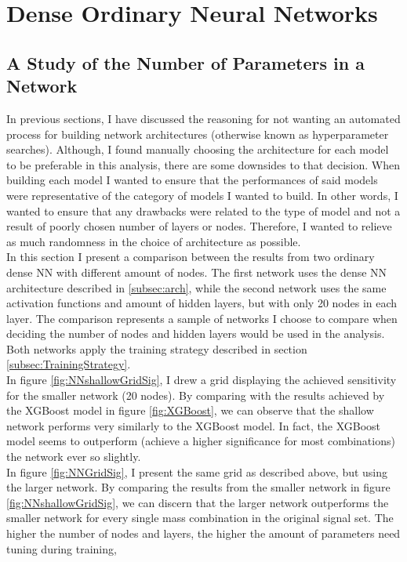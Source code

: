 \section{Dense Ordinary Neural Networks}
\subsection{A Study of the Number of Parameters in a Network}
In previous sections, I have discussed the reasoning for not wanting an automated process for building network architectures (otherwise known
as hyperparameter searches). Although, I found manually choosing the architecture for each model to be preferable in this analysis, there 
are some downsides to that decision. When building each model I wanted to ensure that the performances of said models were representative of 
the category of models I wanted to build. In other words, I wanted to ensure that any drawbacks were related to the type of model and not 
a result of poorly chosen number of layers or nodes. Therefore, I wanted to relieve as much randomness in the choice of architecture as possible.
\\
In this section I present a comparison between the results from two ordinary dense \ac{NN} with different amount of nodes. The first network 
uses the dense \ac{NN} architecture described in \ref{subsec:arch}, while the second network uses the same activation functions and amount of hidden layers,
but with only 20 nodes in each layer. The comparison represents a sample of networks I choose to compare when deciding the number of nodes and 
hidden layers would be used in the analysis. Both networks apply the training strategy described in section \ref{subsec:TrainingStrategy}.
\\
In figure \ref{fig:NNshallowGridSig}, I drew a grid displaying the achieved sensitivity for the smaller network (20 nodes). By comparing with the 
results achieved by the XGBoost model in figure \ref{fig:XGBoost}, we can observe that the shallow network performs very similarly to the XGBoost model. 
In fact, the XGBoost model seems to outperform (achieve a higher significance for most combinations) the network ever so slightly.
\\
In figure \ref{fig:NNGridSig}, I present the same grid as described above, but using the larger network. By comparing the results from the smaller 
network in figure \ref{fig:NNshallowGridSig}, we can discern that the larger network outperforms the smaller network for every single mass 
combination in the original signal set. The higher the number of nodes and layers, the higher the amount of parameters need tuning during training, 
